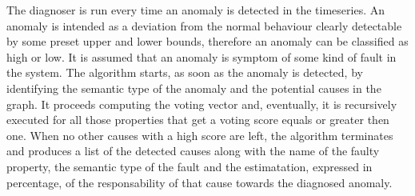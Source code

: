 The diagnoser is run every time an anomaly is detected in the timeseries. An anomaly is intended as a deviation from the normal behaviour clearly detectable by some preset upper and lower bounds, therefore an anomaly can be classified as high or low.
It is assumed that an anomaly is symptom of some kind of fault in the system. The algorithm starts, as soon as the anomaly is detected, by identifying the semantic type of the anomaly and the potential causes in the graph. It proceeds computing the voting vector and, eventually, it is recursively executed for all those properties that get a voting score equals or greater then one. When no other causes with a high score are left, the algorithm terminates and produces a list of the detected causes along with the name of the faulty property, the semantic type of the fault and the estimatation, expressed in percentage, of the responsability of that cause towards the diagnosed anomaly.
